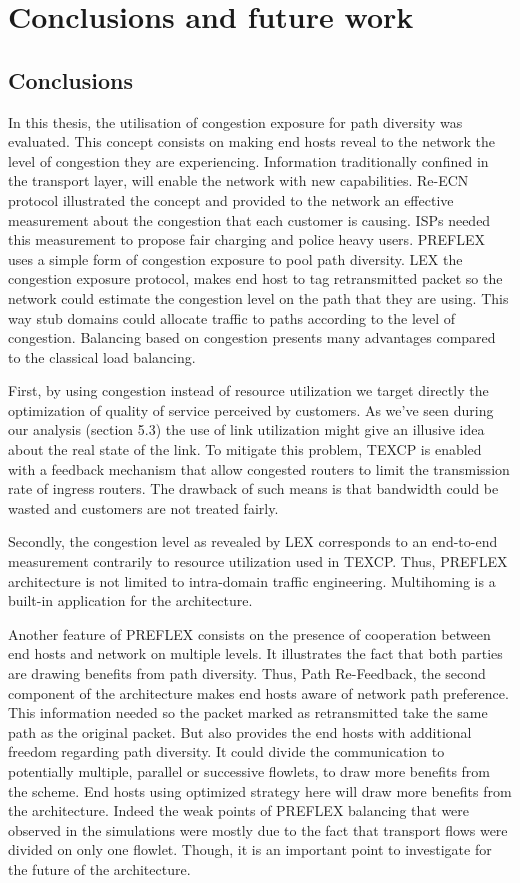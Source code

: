 \chapter{Conclusions and future work}
\label{chap:conclusion}
\section{Conclusions}

In this thesis, the utilisation of congestion exposure for path diversity was evaluated. This concept consists on making end hosts reveal to the network the level of congestion they are experiencing. Information traditionally confined in the transport layer, will enable the network with new capabilities. Re-ECN protocol illustrated the concept and provided  to the network an effective measurement about the congestion that each customer is causing. ISPs needed this measurement to propose fair charging and police heavy users. PREFLEX uses a simple form of congestion exposure to pool path diversity. LEX the congestion exposure protocol, makes end host to tag retransmitted packet so the network could estimate the congestion level on the path that they are using. This way stub domains could allocate traffic to paths according to the level of congestion. Balancing based on congestion presents many advantages compared to the classical load balancing. 

First, by using congestion instead of resource utilization we target directly the optimization of quality of service perceived by customers. As we've seen during our analysis (section 5.3) the use of link utilization might give an illusive idea about the real state of the link.  To mitigate this problem, TEXCP is enabled with a feedback mechanism that allow congested routers to limit the transmission rate of  ingress routers. The drawback of such means is that bandwidth could be wasted and customers are not treated fairly.

Secondly, the congestion level as revealed by LEX corresponds to an end-to-end measurement contrarily to resource utilization used in TEXCP. Thus, PREFLEX architecture is not limited to intra-domain traffic engineering. Multihoming is a built-in application for the architecture.

Another feature of PREFLEX consists on the presence of cooperation between end hosts and network on multiple levels. It illustrates the fact that both parties are drawing benefits from path diversity. Thus, Path Re-Feedback, the second component of the architecture makes end hosts aware of network path preference. This information needed so the packet marked as retransmitted take the same path as the original packet. But also provides the end hosts with additional freedom regarding path diversity. It could divide the communication to potentially multiple, parallel or successive flowlets, to draw more benefits from the scheme. End hosts using optimized strategy here will draw more benefits from the architecture. Indeed the weak points of PREFLEX balancing that were observed in the simulations were mostly due to the fact that transport flows were divided on only one flowlet. Though, it is an important point to investigate for the future of the architecture.
 
